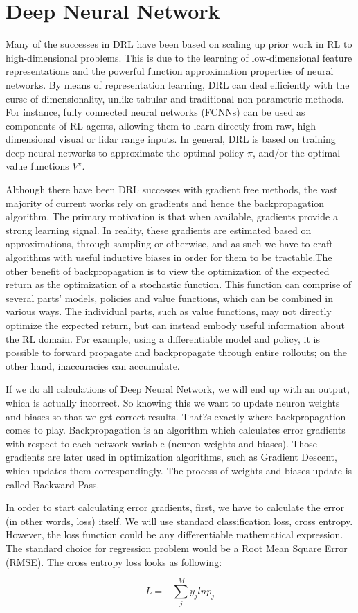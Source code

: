 \section{Deep Neural Network}

Many of the successes in DRL have been based on scaling up prior work in RL to high-dimensional problems. This is due to the learning of low-dimensional feature representations and the powerful function approximation properties of neural networks. By means of representation learning, DRL can deal efficiently with the curse of dimensionality, unlike tabular and traditional non-parametric methods. For instance, fully connected neural networks (FCNNs) can be used as components of RL agents, allowing them to learn directly from raw, high-dimensional visual or lidar range inputs. In general, DRL is based on training deep neural networks to approximate the optimal policy $\pi$, and/or the optimal value functions $V^\star$.

Although there have been DRL successes with gradient free methods, the vast majority of current works rely on gradients and hence the backpropagation algorithm. The primary motivation is that when available, gradients provide a strong learning signal. In reality, these gradients are estimated based on approximations, through sampling or otherwise, and as such we have to craft algorithms with useful inductive biases in order for them to be tractable.The other benefit of backpropagation is to view the optimization of the expected return as the optimization of a stochastic function. This function can comprise of several parts' models, policies and value functions, which can be combined in various ways. The individual parts, such as value functions, may not directly optimize the expected return, but can instead embody useful information about the RL domain. For example, using a differentiable model and policy, it is possible to forward propagate and backpropagate through entire rollouts; on the other hand, inaccuracies can accumulate.

If we do all calculations of Deep Neural Network, we will end up with an output, which is actually incorrect. So knowing this we want to update neuron weights and biases so that we get correct results. That?s exactly where backpropagation comes to play. Backpropagation is an algorithm which calculates error gradients with respect to each network variable (neuron weights and biases). Those gradients are later used in optimization algorithms, such as Gradient Descent, which updates them correspondingly. The process of weights and biases update is called Backward Pass.

In order to start calculating error gradients, first, we have to calculate the error (in other words, loss) itself. We will use standard classification loss, cross entropy. However, the loss function could be any differentiable mathematical expression. The standard choice for regression problem would be a Root Mean Square Error (RMSE). The cross entropy loss looks as following:

\begin{equation} \label{eq:reward-func}
L = - \sum_j^M y_j ln p_j
\end{equation}

\vfill
